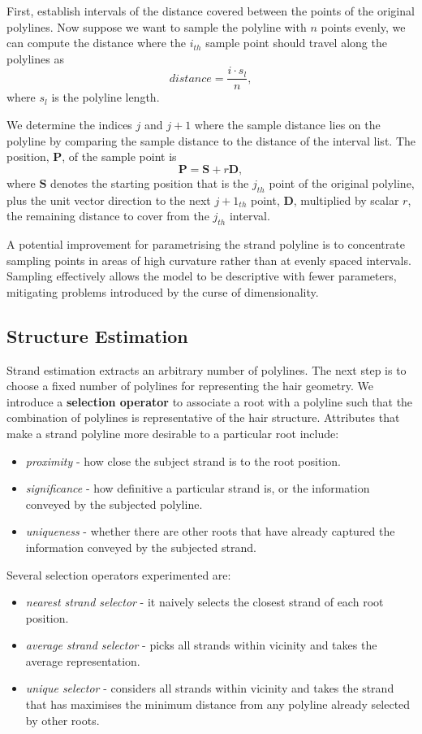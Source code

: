 \documentclass[ %
author={Dillon Keith Diep},
supervisor={Dr. Carl Henrik Ek},
degree={MEng},
title={ART-CG Hair:},
subtitle={Assisted Real-time Content Generation of Stylised Virtual Hair},
type={Research},
year={2017} ]{dissertation}
\begin{document}
First, establish intervals of the distance covered between the points of the original polylines. Now suppose we want to sample the polyline with $n$ points evenly, we can compute the distance where the $i_{th}$ sample point should travel along the polylines as
$$distance=\frac{i \cdot s_l}{n},$$
where $s_l$ is the polyline length.

We determine the indices $j$ and $j+1$ where the sample distance lies on the polyline by comparing the sample distance to the distance of the interval list. The position, $\bm{P}$, of the sample point is
$$\bm{P} = \bm{S} + r\bm{D},$$
where $\bm{S}$ denotes the starting position that is the $j_{th}$ point of the original polyline, plus the unit vector direction to the next $j+1_{th}$ point, $\bm{D}$, multiplied by scalar $r$, the remaining distance to cover from the $j_{th}$ interval.

A potential improvement for parametrising the strand polyline is to concentrate sampling points in areas of high curvature rather than at evenly spaced intervals. Sampling effectively allows the model to be descriptive with fewer parameters, mitigating problems introduced by the curse of dimensionality.

\subsection{Structure Estimation}
Strand estimation extracts an arbitrary number of polylines. The next step is to choose a fixed number of polylines for representing the hair geometry. We introduce a \textbf{selection operator} to associate a root with a polyline such that the combination of polylines is representative of the hair structure. Attributes that make a strand polyline more desirable to a particular root include:
\begin{itemize}
	\item \textit{proximity} - how close the subject strand is to the root position.
	\item \textit{significance} - how definitive a particular strand is, or the information conveyed by the subjected polyline.
	\item \textit{uniqueness} - whether there are other roots that have already captured the information conveyed by the subjected strand.
\end{itemize}
Several selection operators experimented are:
\begin{itemize}
	\item \textit{nearest strand selector} - it naively selects the closest strand of each root position. 
	\item \textit{average strand selector} - picks all strands within vicinity and takes the average representation.
	\item \textit{unique selector} - considers all strands within vicinity and takes the strand that has maximises the minimum distance from any polyline already selected by other roots.
\end{itemize}
\end{document}
